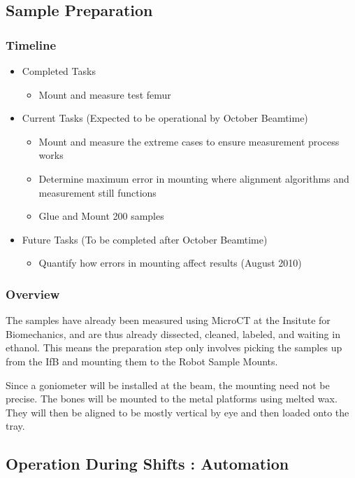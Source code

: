 

\subsection{Sample Preparation}
\subsubsection*{Timeline}
\begin{itemize}
 	\item Completed Tasks
	\begin{itemize}
		\item Mount and measure test femur
	\end{itemize}
	\item Current Tasks (Expected to be operational by October Beamtime)
	\begin{itemize}
		\item Mount and measure the extreme cases to ensure measurement process works
		\item Determine maximum error in mounting where alignment algorithms and measurement still functions
		\item Glue and Mount 200 samples
	\end{itemize}
	\item Future Tasks (To be completed after October Beamtime)
	\begin{itemize}
		\item Quantify how errors in mounting affect results (August 2010)
	\end{itemize}
\end{itemize}
\subsubsection*{Overview}

The samples have already been measured using MicroCT at the Insitute for Biomechanics, and are thus already dissected, cleaned, labeled, and waiting in ethanol. This means the preparation step only involves picking the samples up from the IfB and mounting them to the Robot Sample Mounts.

Since a goniometer will be installed at the beam, the mounting need not be precise. The bones will be mounted to the metal platforms using melted wax. They will then be aligned to be mostly vertical by eye and then loaded onto the tray.

\subsection{Operation During Shifts : Automation}
